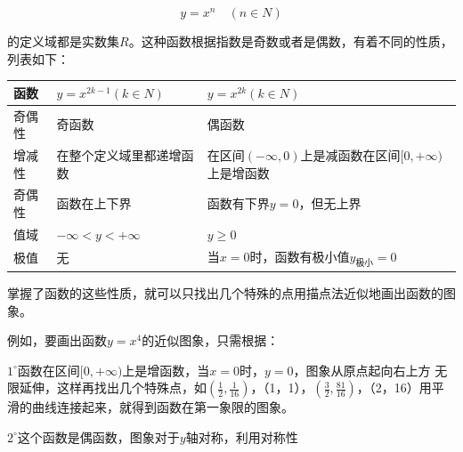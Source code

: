 \[
y = x^{n} \quad (n \in N)
\]

的定义域都是实数集\(R\)。这种函数根据指数是奇数或者是偶数，有着不同的性质，列表如下：

{\def\LTcaptype{none} %
\begin{longtable}[]{@{}
  >{\raggedright\arraybackslash}p{}
  >{\raggedright\arraybackslash}p{}
  >{\raggedright\arraybackslash}p{}@{}}
\toprule\noalign{}
\begin{minipage}[b]{\linewidth}\raggedright
函数
\end{minipage} & \begin{minipage}[b]{\linewidth}\raggedright
\(y = x^{2k-1} (k \in N)\)
\end{minipage} & \begin{minipage}[b]{\linewidth}\raggedright
\(y = x^{2k} (k \in N)\)
\end{minipage} \\
\midrule\noalign{}
\endhead
\bottomrule\noalign{}
\endlastfoot
奇偶性 & 奇函数 & 偶函数 \\
增减性 & 在整个定义域里都递增函数 &
在区间\((-\infty, 0)\)上是减函数在区间\([0, +\infty)\)上是增函数 \\
奇偶性 & 函数在上下界 & 函数有下界\(y = 0\)，但无上界 \\
值域 & \(-\infty < y < +\infty\) & \(y \geq 0\) \\
极值 & 无 & 当\(x = 0\)时，函数有极小值\(y_{\text{极小}} = 0\) \\
\end{longtable}
}

掌握了函数的这些性质，就可以只找出几个特殊的点用描点法近似地画出函数的图象。

例如，要画出函数\(y = x^4\)的近似图象，只需根据：

\(1^{\circ}\)函数在区间\([0, +\infty)\)上是增函数，当\(x = 0\)时，\(y = 0\)，图象从原点起向右上方
无限延伸，这样再找出几个特殊点，如\(\left(\frac{1}{2},\frac{1}{16}\right)\)，（1，1），\(\left(\frac{3}{2},\frac{81}{16}\right)\)，（2，16）用平滑的曲线连接起来，就得到函数在第一象限的图象。

\(2^{\circ}\)这个函数是偶函数，图象对于\(y\)轴对称，利用对称性

